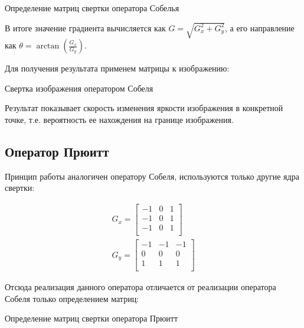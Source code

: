 \begin{minipage}{0.75\textwidth}
	\begin{algorithm}[H]
		
		\caption{Определение матриц свертки оператора Собелья}
		\label{imp:sobel-matrix}
	\end{algorithm}
\end{minipage}

В итоге значение градиента вычисляется как $G=\sqrt{G_x^2+G_y^2}$, а его направление как $\theta=\arctan(\frac{G_x}{G_y})$.

Для получения результата применем матрицы к изображению:


\begin{minipage}{0.75\textwidth}
	\begin{algorithm}[H]
		
		\caption{Свертка изображения оператором Собеля}
		\label{imp:sobel}
	\end{algorithm}
\end{minipage}

Результат показывает скорость изменения яркости изображения в конкретной точке, т.е. вероятность ее нахождения на границе изображения.

\subsection{Оператор Прюитт}

Принцип работы\cite{Prewitt} аналогичен оператору Собеля, используются только другие ядра свертки:

\begin{eqnarray}\label{eq:prewitt-matrixs}
G_x = \begin{bmatrix}
-1 & 0 & 1\\
-1 & 0 & 1\\
-1 & 0 & 1\\
\end{bmatrix} \\
G_y = \begin{bmatrix}
-1 & -1 & -1\\
0 & 0 & 0\\
1 & 1 & 1\\
\end{bmatrix}
\end{eqnarray}

Отсюда реализация данного оператора отличается от реализации оператора Собеля только определением матриц:

\begin{minipage}{0.75\textwidth}
	\begin{algorithm}[H]
		
		\caption{Определение матриц свертки оператора Прюитт}
		\label{imp:prewitt-matrix}
	\end{algorithm}
\end{minipage}

